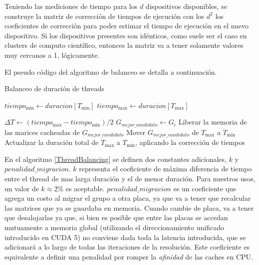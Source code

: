 Teniendo las mediciones de tiempo para los $d$ dispositivos disponibles, se construye la matriz de
correcci\'on de tiempos de ejecuci\'on con los $d^2$ los coeficientes de correcci\'on para poder estimar el tiempo de
ejecuci\'on en el nuevo dispositivo. Si los dispositivos presentes son id\'enticos, como suele ser el caso
en clusters de computo cient\'ifico, entonces
la matriz va a tener solamente valores muy cercanos a 1, l\'ogicamente.

El pseudo c\'odigo del algoritmo de balanceo se detalla a continuaci\'on.
\begin{algorithm}
  \caption{Balanceo de duraci\'on de threads}
  \label{ThreadBalancing}
\begin{algorithmic}
  \State $tiempo_{\min} \gets duracion[T_{\min}]$
  \State $tiempo_{\max} \gets duracion[T_{\max}]$

    \State $\Delta T \gets (tiempo_{\max} - tiempo_{\min}) /2$
        \State $G_{mejor\_candidato} \gets G_i$
      \EndIf
    \EndFor
   \State Liberar la memoria de las marices cacheadas de $G_{mejor\_candidato}$
   \State Mover $G_{mejor\_candidato}$ de $T_{\max}$ a $T_{\min}$
   \State Actualizar la duraci\'on total de $T_{\max}$ a $T_{\min}$, aplicando la correcci\'on de tiempos
  \EndWhile
\end{algorithmic}
\end{algorithm}

En el algoritmo \ref{ThreadBalancing} se definen dos constantes adicionales, $k$ y $penalidad\_migracion$.
$k$ representa el coeficiente de m\'axima diferencia de tiempo entre el thread de mas larga duraci\'on y el de menor
duraci\'on. Para nuestros usos, un valor de $k \approx 2\%$ es aceptable.
$penalidad\_migracion$ es un coeficiente que agrega un costo al migrar el grupo a otra placa, ya que va
a tener que recalcular las matrices que ya se guardaba en memoria. Cuando cambie de placa, va a tener
que desalojarlas ya que, si bien es posible que entre las placas se accedan mutuamente a memoria global (utilizando
el direccionamiento unificado introducido en CUDA 5)
no conviene dada toda la latencia introducida, que se adicionar\'a a lo largo de todas las iteraciones de la resoluci\'on.
Este coeficiente es equivalente a definir una penalidad por romper la \textit{afinidad} de las caches en CPU.

